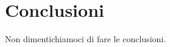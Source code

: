 \clearpage{\pagestyle{empty}\cleardoublepage}
\chapter*{Conclusioni}


Non dimentichiamoci di fare le conclusioni.